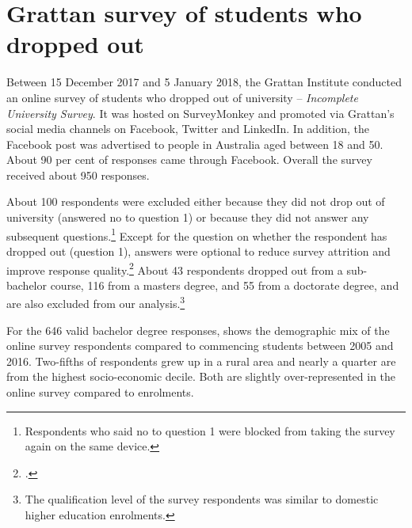 \chapter{Grattan survey of students who dropped out}\label{chap:b}

Between 15 December 2017 and 5 January 2018, the Grattan Institute conducted an online survey of students who dropped out of university -- \emph{Incomplete University Survey}. It was hosted on SurveyMonkey and promoted via Grattan's social media channels on Facebook, Twitter and LinkedIn. In addition, the Facebook post was advertised to people in Australia aged between 18 and 50. About 90 per cent of responses came through Facebook. Overall the survey received about 950 responses.

About 100 respondents were excluded either because they did not drop out of university (answered no to question 1) or because they did not answer any subsequent questions.\footnote{Respondents who said no to question 1 were blocked from taking the survey again on the same device.} 
Except for the question on whether the respondent has dropped out (question 1), answers were optional to reduce survey attrition and improve response quality.\footcite[][556--558]{Krosnick1999} 
About 43 respondents dropped out from a sub-bachelor course, 116 from a masters degree, and 55 from a doctorate degree, and are also excluded from our analysis.\footnote{The qualification level of the survey respondents was similar to domestic higher education enrolments.}

For the 646 valid bachelor degree responses,  shows the demographic mix of the online survey respondents compared to commencing students between 2005 and 2016. Two-fifths of respondents grew up in a rural area and nearly a quarter are from the highest socio-economic decile. Both are slightly over-represented in the online survey compared to enrolments.


